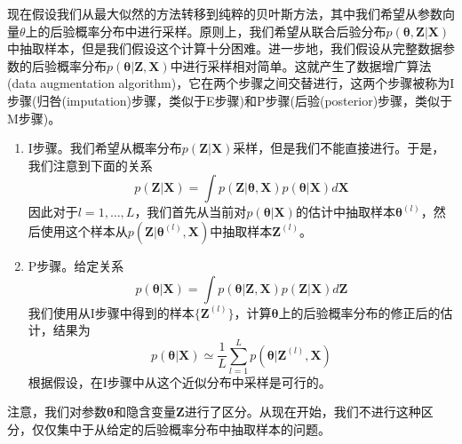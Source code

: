 现在假设我们从最大似然的方法转移到纯粹的贝叶斯方法，其中我们希望从参数向量$\theta$上的后验概率分布中进行采样。原则上，我们希望从联合后验分布$p(\boldsymbol{\theta},\boldsymbol{Z}|\boldsymbol{X})$中抽取样本，但是我们假设这个计算十分困难。进一步地，我们假设从完整数据参数的后验概率分布$p(\boldsymbol{\theta}|\boldsymbol{Z},\boldsymbol{X})$中进行采样相对简单。这就产生了数据增广算法(data augmentation algorithm)，它在两个步骤之间交替进行，这两个步骤被称为I步骤(归咎(imputation)步骤，类似于E步骤)和P步骤(后验(posterior)步骤，类似于M步骤)。
\begin{enumerate}
	\item I步骤。我们希望从概率分布$p(\boldsymbol{Z}|\boldsymbol{X})$采样，但是我们不能直接进行。于是，我们注意到下面的关系
	\begin{equation}
		p(\boldsymbol{Z}|\boldsymbol{X})=\int p(\boldsymbol{Z}|\boldsymbol{\theta},\boldsymbol{X})p(\boldsymbol{\theta}|\boldsymbol{X})d\boldsymbol{X}
	\end{equation}
	因此对于$l=1,\dots,L$，我们首先从当前对$p(\boldsymbol{\theta}|\boldsymbol{X})$的估计中抽取样本$\boldsymbol{\theta}^{(l)}$，然后使用这个样本从$p(\boldsymbol{Z}|\boldsymbol{\theta}^{(l)},\boldsymbol{X})$中抽取样本$\boldsymbol{Z}^{(l)}$。
	\item P步骤。给定关系
	\begin{equation}
		p(\boldsymbol{\theta}|\boldsymbol{X})=\int p(\boldsymbol{\theta}|\boldsymbol{Z},\boldsymbol{X})p(\boldsymbol{Z}|\boldsymbol{X})d\boldsymbol{Z}
	\end{equation}
	我们使用从I步骤中得到的样本$\{\boldsymbol{Z}^{(l)} \}$，计算$\boldsymbol{\theta}$上的后验概率分布的修正后的估计，结果为
	\begin{equation}
		p(\boldsymbol{\theta}|\boldsymbol{X})\simeq \frac{1}{L}\sum_{l=1}^{L}p(\boldsymbol{\theta}|\boldsymbol{Z}^{(l)},\boldsymbol{X})
	\end{equation}
	根据假设，在I步骤中从这个近似分布中采样是可行的。
\end{enumerate}

注意，我们对参数$\boldsymbol{\theta}$和隐含变量$\boldsymbol{Z}$进行了区分。从现在开始，我们不进行这种区分，仅仅集中于从给定的后验概率分布中抽取样本的问题。
